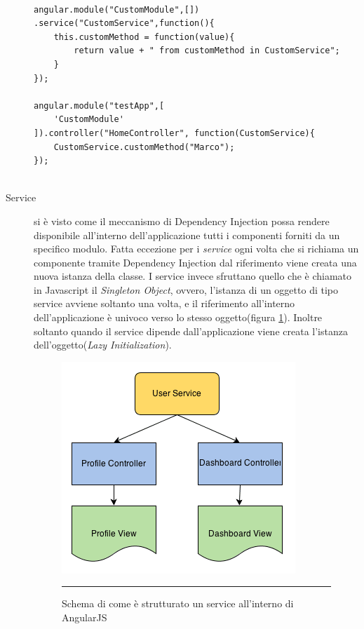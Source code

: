 \begin{description}
\begin{lstlisting}[caption = {Un esempio di creazione di un modulo e la sua inclusione all'interno di un altro}, 
				   label = {lst:controllerExample}]

angular.module("CustomModule",[])
.service("CustomService",function(){
	this.customMethod = function(value){
		return value + " from customMethod in CustomService";	
	}
});

angular.module("testApp",[
	'CustomModule'
]).controller("HomeController", function(CustomService){
	CustomService.customMethod("Marco");
});


\end{lstlisting}

\item[Service] si è visto come il meccanismo di Dependency Injection possa rendere disponibile all'interno dell'applicazione tutti i componenti forniti da un specifico modulo. Fatta eccezione per i \emph{service} ogni volta che si richiama un componente tramite Dependency Injection dal riferimento viene creata una nuova istanza della classe. I service invece sfruttano quello che è chiamato in Javascript il \emph{Singleton Object}, ovvero, l'istanza di un oggetto di tipo service avviene soltanto una volta, e il riferimento all'interno dell'applicazione è univoco verso lo stesso oggetto(figura \ref{fig:AngularJS-Singleton}). Inoltre soltanto quando il service dipende dall'applicazione viene creata l'istanza dell'oggetto(\emph{Lazy Initialization}).

\begin{figure}[htbp]
  \centering
    \includegraphics[scale=0.75]{Figures/angularjs-service-singleton-diagram.png}  
    \rule{35em}{0.5pt}
  \caption[AngularJS Singleton]{Schema di come è strutturato un service all'interno di AngularJS}
  \label{fig:AngularJS-Singleton}
\end{figure}


\end{description}
